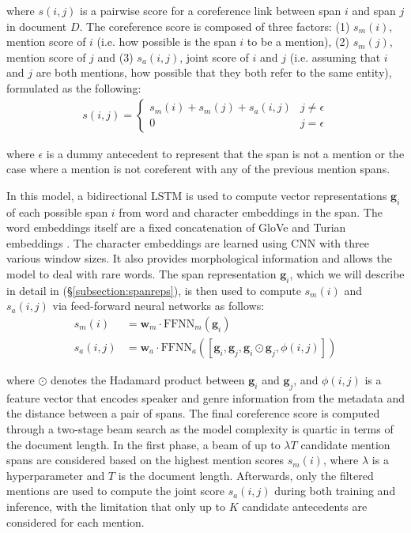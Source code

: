 \documentclass[11pt]{article}
\begin{document}
where $s(i,j)$ is a pairwise score for a coreference link between span $i$ and span $j$ in document $D$. The coreference score is composed of three factors: (1) $s_{m}(i)$, mention score of $i$ (i.e. how possible is the span $i$ to be a mention), (2) $s_{m}(j)$, mention score of $j$ and (3) $s_{a}(i,j)$, joint score of $i$ and $j$ (i.e. assuming that $i$ and $j$ are both mentions, how possible that they both refer to the same entity), formulated as the following:
\begin{align}
s(i, j) = \begin{cases}
s_{m}(i) + s_{m}(j) + s_{a}(i, j) & j \neq \epsilon \\
0 & j = \epsilon
\end{cases}
\end{align} 

where $\epsilon$ is a dummy antecedent to represent that the span is not a mention or the case where a mention is not coreferent with any of the previous mention spans.

In this model, a bidirectional LSTM \parencite{lstm} is used to compute vector representations $\pmb{g}_{i}$ of each possible span $i$ from word and character embeddings in the span. The word embeddings itself are a fixed concatenation of GloVe \parencite{pennington2014glove} and Turian embeddings \parencite{turian-etal-2010-word}. The character embeddings are learned using CNN with three various window sizes. It also provides morphological information and allows the model to deal with rare words. The span representation $\pmb{g}_{i}$, which we will describe in detail in (\S\ref{subsection:spanreps}), is then used to compute $s_{m}(i)$ and $s_{a}(i, j)$ via feed-forward neural networks as follows:
\begin{align}
s_{m}(i) &= \pmb{w}_{m} \cdot \text{FFNN}_{m}(\pmb{g}_{i}) \\
s_{a}(i, j) &= \pmb{w}_{a} \cdot \text{FFNN}_{a}([\pmb{g}_{i}, \pmb{g}_{j}, \pmb{g}_{i} \odot \pmb{g}_{j}, \phi(i, j)])
\end{align}

where $\odot$ denotes the Hadamard product between $\pmb{g}_{i}$ and $\pmb{g}_{j}$, and $\phi(i, j)$ is a feature vector that encodes speaker and genre information from the metadata and the distance between a pair of spans. The final coreference score is computed through a two-stage beam search as the model complexity is quartic in terms of the document length. In the first phase, a beam of up to $\lambda T$ candidate mention spans are considered based on the highest mention scores $s_{m}(i)$, where $\lambda$ is a hyperparameter and $T$ is the document length. Afterwards, only the filtered mentions are used to compute the joint score $s_{a}(i, j)$ during both training and inference, with the limitation that only up to $K$ candidate antecedents are considered for each mention.
\end{document}
